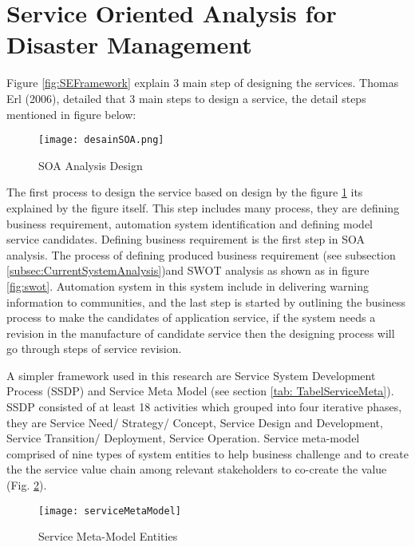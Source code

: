 \section{Service Oriented Analysis for Disaster Management}
Figure \ref{fig:SEFramework} explain 3 main step of designing the services. Thomas Erl (2006), detailed that 3 main steps to design a service, the detail steps mentioned in figure below:
\begin{figure}[H]
\centering
\texttt{[image: desainSOA.png]}
\caption{SOA Analysis Design\cite{ThesisKangTeguh}}
\label{fig:DesainSOA}
\end{figure}\par

The first process to design the service based on design by the figure \ref{fig:DesainSOA} its explained by the figure itself. This step includes many process, they are defining business requirement, automation system identification and defining model service candidates. Defining business requirement is the first step in SOA analysis. The process of defining produced business requirement (see subsection \ref{subsec:CurrentSystemAnalysis})and SWOT analysis as shown as in figure \ref{fig:swot}. Automation system in this system include in delivering warning information to communities, and the last step is  started by outlining the business process to make the candidates of application service, if the system needs a revision in the manufacture of candidate service then the designing process will go through steps of service revision.\par
A simpler framework used in this research are Service System Development Process (SSDP) and Service Meta Model (see section \ref{tab: TabelServiceMeta}). SSDP consisted of at least 18 activities which grouped into four iterative phases, they are Service Need/ Strategy/ Concept, Service Design and Development, Service Transition/ Deployment, Service Operation. Service meta-model comprised of nine types of system entities to help business challenge and to create the the service value chain among relevant stakeholders to co-create the value (Fig. \ref{fig:MetaModelFig}).\par

\begin{figure}[H]
\begin{center}
\texttt{[image: serviceMetaModel]}
\caption{Service Meta-Model Entities \cite{Lopes2013}}
\label{fig:MetaModelFig}
\end{center}
\end{figure}\par

